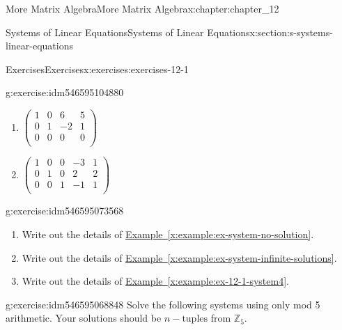 \documentclass[oneside,10pt,]{book}
\newcommand{\xreffont}{\relax}
\numberwithin{equation}{section}
\begin{document}
\begin{chapterptx}{More Matrix Algebra}{}{More Matrix Algebra}{}{}{x:chapter:chapter_12}
\begin{sectionptx}{Systems of Linear Equations}{}{Systems of Linear Equations}{}{}{x:section:s-systems-linear-equations}
\begin{exercises-subsection}{Exercises}{}{Exercises}{}{}{x:exercises:exercises-12-1}
\begin{divisionexercise}{3}{}{}{g:exercise:idm546595104880}
\begin{multicols}{2}
\begin{enumerate}[label=(\alph*)]
\right)\)%
\item{}\(\left(
\begin{array}{ccc|c}
1 & 0 & 6 & 5 \\
0 & 1 & -2 & 1 \\
0 & 0 & 0 & 0 \\
\end{array}
\right)\)%
\item{}\(\left(
\begin{array}{cccc|c}
1 & 0 & 0 & -3 & 1 \\
0 & 1 & 0 & 2 & 2 \\
0 & 0 & 1 & -1 & 1 \\
\end{array}
\right)\)%
\end{enumerate}
\end{multicols}
%
\end{divisionexercise}%
\begin{divisionexercise}{4}{}{}{g:exercise:idm546595073568}%
%
\begin{enumerate}[label=(\alph*)]
\item{}Write out the details of \hyperref[x:example:ex-system-no-solution]{Example~{\xreffont\ref{x:example:ex-system-no-solution}}}.%
\item{}Write out the details of \hyperref[x:example:ex-system-infinite-solutions]{Example~{\xreffont\ref{x:example:ex-system-infinite-solutions}}}.%
\item{}Write out the details of \hyperref[x:example:ex-12-1-system4]{Example~{\xreffont\ref{x:example:ex-12-1-system4}}}.%
\end{enumerate}
%
\end{divisionexercise}%
\begin{divisionexercise}{5}{}{}{g:exercise:idm546595068848}%
Solve the following systems using only mod 5 arithmetic. Your solutions should be \(n-\textrm{tuples}\) from \(\mathbb{Z}_5\).%
\end{divisionexercise}
\end{exercises-subsection}
\end{sectionptx}
\end{chapterptx}
\end{document}

